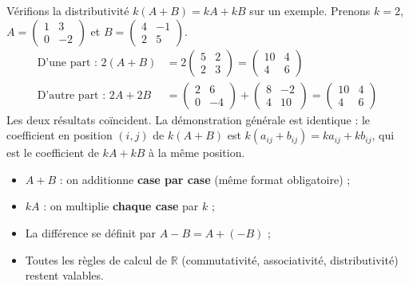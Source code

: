 \documentclass[11pt]{article}
\begin{document}
\begin{experience}
Vérifions la distributivité $k(A+B) = kA + kB$ sur un exemple. Prenons $k=2$, $A = \begin{pmatrix} 1 & 3 \\ 0 & -2 \end{pmatrix}$ et $B = \begin{pmatrix} 4 & -1 \\ 2 & 5 \end{pmatrix}$.
\begin{align*}
\text{D'une part : } 2(A+B) &= 2\begin{pmatrix} 5 & 2 \\ 2 & 3 \end{pmatrix} = \begin{pmatrix} 10 & 4 \\ 4 & 6 \end{pmatrix} \\
\text{D'autre part : } 2A + 2B &= \begin{pmatrix} 2 & 6 \\ 0 & -4 \end{pmatrix} + \begin{pmatrix} 8 & -2 \\ 4 & 10 \end{pmatrix} = \begin{pmatrix} 10 & 4 \\ 4 & 6 \end{pmatrix}
\end{align*}
Les deux résultats coïncident. La démonstration générale est identique : le coefficient en position $(i,j)$ de $k(A+B)$ est $k(a_{ij}+b_{ij}) = ka_{ij} + kb_{ij}$, qui est le coefficient de $kA + kB$ à la même position.
\end{experience}

\begin{aretenir}[L'essentiel]
\begin{itemize}
\item $A + B$ : on additionne \textbf{case par case} (même format obligatoire) ;
\item $kA$ : on multiplie \textbf{chaque case} par $k$ ;
\item La différence se définit par $A - B = A + (-B)$ ;
\item Toutes les règles de calcul de $\mathbb{R}$ (commutativité, associativité, distributivité) restent valables.
\end{itemize}
\end{aretenir}
\end{document}
